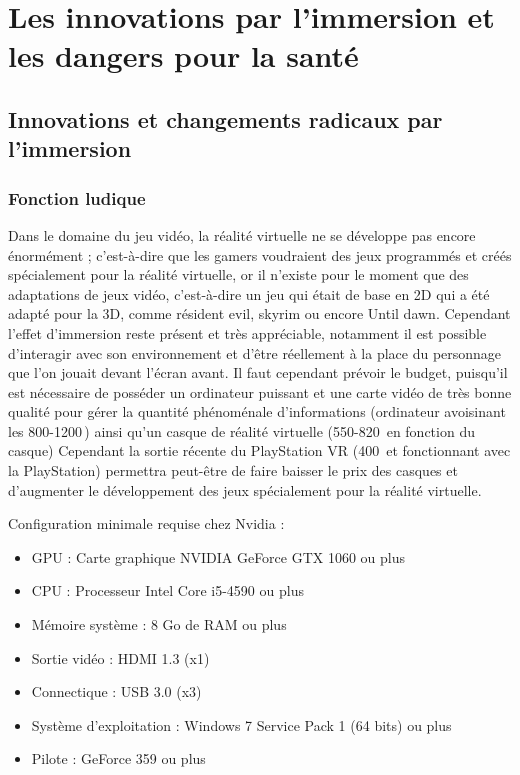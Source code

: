 \documentclass[12pt, a4paper]{report}
\newcommand{\euro}{\,\EUR}
\begin{document}
 \part[Innovations et dangers]{Les innovations par l'immersion et les dangers pour la santé}

 \chapter[Innovations]{Innovations et changements radicaux par l'immersion}

 \section{Fonction ludique}

Dans le domaine du jeu vidéo, la réalité virtuelle ne se développe pas encore énormément ; c'est-à-dire que les gamers voudraient des jeux programmés et créés spécialement pour la réalité virtuelle, or il n'existe pour le moment que des adaptations de jeux vidéo, c'est-à-dire un jeu qui était de base en 2D qui a été adapté pour la 3D, comme résident evil, skyrim ou encore Until dawn. Cependant l'effet d'immersion reste présent et très appréciable, notamment il est possible d'interagir avec son environnement et d'être réellement à la place du personnage que l'on jouait devant l'écran avant. Il faut cependant prévoir le budget, puisqu'il est nécessaire de posséder un ordinateur puissant et une carte vidéo de très bonne qualité pour gérer la quantité phénoménale d'informations (ordinateur avoisinant les 800-1200\euro) ainsi qu'un casque de réalité virtuelle (550-820 \euro en fonction du casque) Cependant la sortie récente du PlayStation VR (400 \euro et fonctionnant avec la PlayStation) permettra peut-être de faire baisser le prix des casques et d'augmenter le développement des jeux spécialement pour la réalité virtuelle.

\vspace{0.5cm}

\noindent Configuration minimale requise chez Nvidia :
\begin{itemize}

\item GPU : Carte graphique NVIDIA GeForce GTX 1060 ou plus
\item CPU : Processeur Intel Core i5-4590 ou plus
\item Mémoire système : 8 Go de RAM ou plus
\item Sortie vidéo : HDMI 1.3 (x1)
\item Connectique : USB 3.0 (x3)
\item Système d'exploitation : Windows 7 Service Pack 1 (64 bits) ou plus
\item Pilote : GeForce 359 ou plus

\end{itemize}
\end{document}
